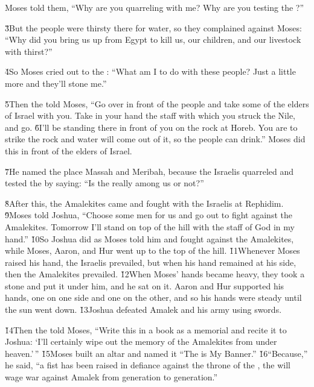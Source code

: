 Moses told them, ``Why are you quarreling with me? Why are you testing the ?''

\v{3}But the people were thirsty there for water, so they complained against Moses: ``Why did you bring us up from Egypt to kill us, our children, and our livestock with thirst?''

\v{4}So Moses cried out to the : ``What am I to do with these people? Just a little more and they'll stone me.''

\v{5}Then the  told Moses, ``Go over in front of the people and take some of the elders of Israel with you. Take in your hand the staff with which you struck the Nile, and go. \v{6}I'll be standing there in front of you on the rock at Horeb. You are to strike the rock and water will come out of it, so the people can drink.'' Moses did this in front of the elders of Israel.

\v{7}He named the place Massah and Meribah, because the Israelis quarreled and tested the  by saying: ``Is the  really among us or not?''

\v{8}After this, the Amalekites came and fought with the Israelis at Rephidim. \v{9}Moses told Joshua, ``Choose some men for us and go out to fight against the Amalekites. Tomorrow I'll stand on top of the hill with the staff of God in my hand.'' \v{10}So Joshua did as Moses told him and fought against the Amalekites, while Moses, Aaron, and Hur went up to the top of the hill. \v{11}Whenever Moses raised his hand, the Israelis prevailed, but when his hand remained at his side, then the Amalekites prevailed. \v{12}When Moses' hands became heavy, they took a stone and put it under him, and he sat on it. Aaron and Hur supported his hands, one on one side and one on the other, and so his hands were steady until the sun went down. \v{13}Joshua defeated Amalek and his army using swords.

\v{14}Then the  told Moses, ``Write this in a book as a memorial and recite it to Joshua: `I'll certainly wipe out the memory of the Amalekites from under heaven.'\,'' \v{15}Moses built an altar and named it ``The  is My Banner.'' \v{16}``Because,'' he said, ``a fist has been raised in defiance against the throne of the , the  will wage war against Amalek from generation to generation.''

